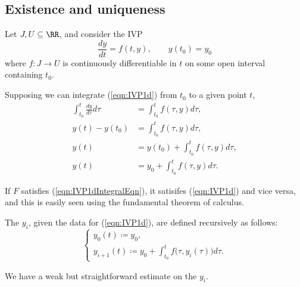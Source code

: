 \documentclass{article}
\begin{document}
\subsection{Existence and uniqueness}

Let $J, U \subseteq \RR$, and consider the IVP
\begin{equation}
    \label{eqn:IVP1d}
    \tag{IVP-$1$D}
    \frac{dy}{dt} = f(t,y),\qquad
    y(t_0)=y_0
\end{equation}
where $f: J \to U$ is continuously differentiable in $t$ on some open interval containing $t_0$.

Supposing we can integrate (\ref{eqn:IVP1d}) from $t_0$ to a given point $t$,
\begin{align*}
    \int_{t_0}^t \frac{dy}{d\tau}d\tau
    &=
    \int_{t_0}^t f(\tau, y)d\tau, \\
    y(t)-y(t_0)
    &=
    \int_{t_0}^t f(\tau, y)d\tau, \\
    \label{eqn:IVP1dIntegralEqn}
    \tag{$\int$IVP-$1$D}
    y(t)
    &=
    y(t_0) + \int_{t_0}^t f(\tau, y)d\tau, \\
    y(t)
    &=
    y_0 + \int_{t_0}^t f(\tau, y)d\tau.
\end{align*}

If $F$ satisfies (\ref{eqn:IVP1dIntegralEqn}), it satisifes (\ref{eqn:IVP1d}) and vice versa, and this is easily seen using the fundamental theorem of calculus.

\begin{definition}
    The  $y_i$, given the data for (\ref{eqn:IVP1d}), are defined recursively as follows:
    \begin{equation}
        \label{eqn:PicardIter}
        \tag{Picard}
        \begin{cases}
            y_0(t) \coloneq y_0, \\
            y_{i+1}(t) \coloneq y_0 + \int_{t_0}^tf\big(\tau,y_i(\tau)\big)d\tau.
        \end{cases}
    \end{equation}
\end{definition}

We have a weak but straightforward estimate on the $y_i$.
\end{document}
